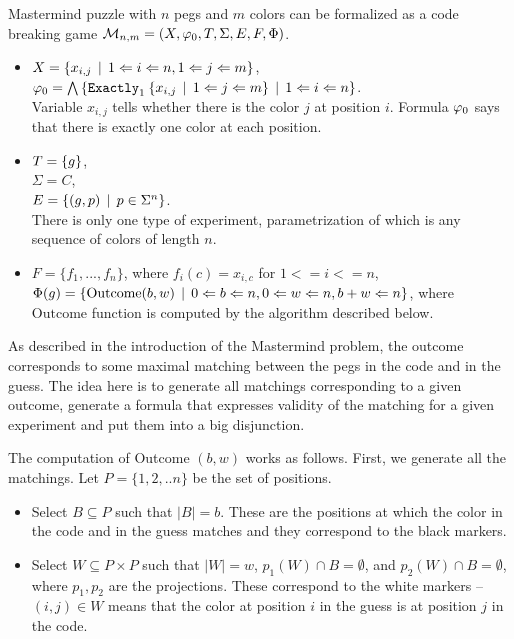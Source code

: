 \begin{example}[Mastermind] \label{ex:form-mastermind2}
Mastermind puzzle with $n$ pegs and $m$ colors can be formalized as
a code breaking game
$\mathcal{M}_{n,m} = (X, \varphi_0, T, \Sigma, E, F, \Phi)$.

\begin{itemize}
\item
$X = \{x_{i,j} \:\:|\:\: 1<=i<=n, 1<=j<=m \}$, \\
$\varphi_0 = \bigwedge\left\{
  \mathtt{Exactly}_{1}\: \{x_{i,j} \:\:|\:\: 1<=j<=m\} \:\:|\:\: 1<=i<=n\right\}$. \\
Variable $x_{i,j}$ tells whether there is the color $j$ at position $i$.
Formula $\varphi_0$ says that there is exactly one color at each position.

\item
$T = \{ g \}$,\\
$\Sigma = C$, \\
$E = \{(g, p) \:\:|\:\: p\in\Sigma^{n}\}$.\\
There is only one type of experiment,
  parametrization of which is any sequence of colors of length $n$.

\item
$F = \{ f_1, ..., f_n \}$, where $f_i(c) = x_{i,c}$ for $1<=i<=n$, \\
$\Phi(g) = \{ \textrm{Outcome}(b, w) \:\:|\:\: 0<=b<=n, 0<=w<=n, b+w<=n \}$,
where $\textrm{Outcome}$ function is computed by the algorithm described below.
\end{itemize}

As described in the introduction of the Mastermind problem,
  the outcome corresponds to some maximal matching between the pegs
  in the code and in the guess.
The idea here is to generate all matchings corresponding to a given outcome,
  generate a formula that expresses validity
  of the matching for a given experiment and
  put them into a big disjunction.

The computation of Outcome $(b, w)$ works as follows.
First, we generate all the matchings. Let $P = \{1,2,..n\}$
  be the set of positions.
\begin{itemize}
\item Select $B\subseteq P$ such that $|B| = b$.
  These are the positions at which the color
  in the code and in the guess matches and
  they correspond to the black markers.
\item Select $W\subseteq P\times P$ such that $|W| = w$,
  $p_1(W)\cap B = \emptyset$, and $p_2(W)\cap B = \emptyset$,
  where $p_1, p_2$ are the projections.
  These correspond to the white markers -- $(i, j) \in W$ means that the color
  at position $i$ in the guess is at position $j$ in the code.
\end{itemize}


\end{example}
